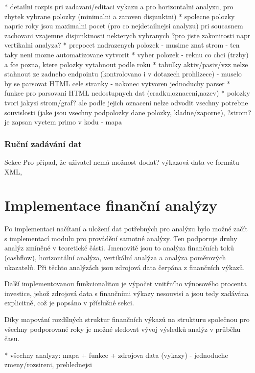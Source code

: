 * detailni rozpis pri zadavani/editaci vykazu a pro horizontalni analyzu, pro zbytek vybrane polozky (minimalni a zaroven disjunktni)
* spolecne polozky napric roky jsou maximalni pocet (pro co nejdetailnejsi analyzu) pri soucasnem zachovani vzajemne disjunktnosti nekterych vybranych ?pro jiste zakonitosti napr vertikalni analyza?
* prepocet nadrazenych polozek - musime znat strom - ten taky neni mozne automatizovane vytvorit
* vyber polozek - reknu co chci (trzby) a fce pozna, ktere polozky vytahnout podle roku
* tabulky aktiv/pasiv/vzz nelze stahnout ze zadneho endpointu (kontrolovano i v dotazech prohlizece) - muselo by se parsovat HTML cele stranky - nakonec vytvoren jednoduchy parser
* funkce pro parsovani HTML nedostupnych dat (cradku,oznaceni,nazev)
* polozky tvori jakysi strom/graf? ale podle jejich oznaceni nelze odvodit vsechny potrebne souvislosti (jake jsou vsechny podpolozky dane polozky, kladne/zaporne), ?strom? je zapsan vyctem primo v kodu - mapa

\subsubsection{Ruční zadávání dat}
Sekce
Pro případ, že uživatel nemá možnost dodat? výkazová data ve formátu XML, 





\section{Implementace finanční analýzy}
Po implementaci načítaní a uložení dat potřebných pro analýzu bylo možné začít s implementací modulu pro provádění samotné analýzy. Ten podporuje druhy analýz zmíněné v teoretické části. Jmenovitě jsou to analýza finančních toků (cashflow), horizontální analýza, vertikální analýza a analýza poměrových ukazatelů. Při těchto analýzách jsou zdrojová data čerpána z finančních výkazů. 

Další implementovanou funkcionalitou je výpočet vnitřního výnosového procenta investice, jehož zdrojová data s finančními výkazy nesouvisí a jsou tedy zadávána explicitně, což je popsáno v příslušné sekci.

Díky mapování rozdílných struktur finančních výkazů na strukturu společnou pro všechny podporované roky je možné sledovat vývoj výsledků analýz v průběhu času.

* všechny analyzy: mapa + funkce + zdrojova data (vykazy) - jednoduche zmeny/rozsireni, prehlednejsi


